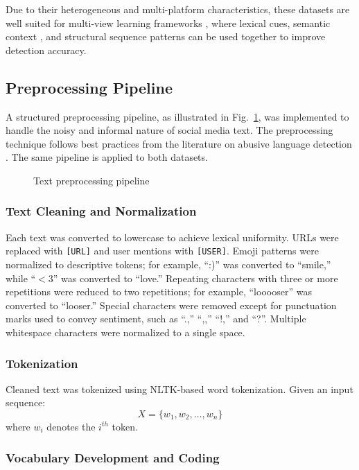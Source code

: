 Due to their heterogeneous and multi-platform characteristics, these datasets are well suited for multi-view learning frameworks \cite{ref19}, where lexical cues, semantic context \cite{ref9}, and structural sequence patterns \cite{ref8} can be used together to improve detection accuracy.

\subsection{Preprocessing Pipeline}

A structured preprocessing pipeline, as illustrated in Fig.~\ref{fig:preprocessing}, was implemented to handle the noisy and informal nature of social media text. The preprocessing technique follows best practices from the literature on abusive language detection \cite{ref2, ref12}. The same pipeline is applied to both datasets.

\begin{figure}[!t]
\centering

\caption{Text preprocessing pipeline}
\label{fig:preprocessing}
\end{figure}

\subsubsection{Text Cleaning and Normalization}

Each text was converted to lowercase to achieve lexical uniformity. URLs were replaced with \texttt{[URL]} and user mentions with \texttt{[USER]}. Emoji patterns were normalized to descriptive tokens; for example, ``:)'' was converted to ``smile,'' while ``$<$3'' was converted to ``love.'' Repeating characters with three or more repetitions were reduced to two repetitions; for example, ``looooser'' was converted to ``looser.'' Special characters were removed except for punctuation marks used to convey sentiment, such as ``.,'' ``,,'' ``!,'' and ``?''. Multiple whitespace characters were normalized to a single space.

\subsubsection{Tokenization}

Cleaned text was tokenized using NLTK-based word tokenization. Given an input sequence:
\[
X = \{ w_1, w_2, \ldots, w_n \}
\]
where $w_i$ denotes the $i^{th}$ token.

\subsubsection{Vocabulary Development and Coding}


